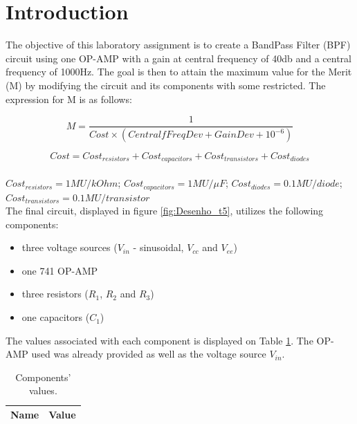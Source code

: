 
\section{Introduction}
\label{sec:introduction}



The objective of this laboratory assignment is to create a BandPass Filter (BPF) circuit using one OP-AMP with a gain at central frequency of 40db and a central frequency of 1000Hz. The goal is then to attain the maximum value for the Merit (M) by modifying the circuit and its components with some restricted. The expression for M is as follows:

\[
M = \frac{1}{Cost\times (CentralfFreqDev + GainDev + 10^{-6})}
\]

\[
 Cost = Cost_{resistors} + Cost_{capacitors} + Cost_{transistors} + Cost_{diodes} 
\] \\

$Cost_{resistors} = 1MU/kOhm$; $Cost_{capacitors} = 1MU/\mu F$; $Cost_{diodes} = 0.1MU/diode$; $Cost_{transistors} = 0.1MU/transistor$ \\

The final circuit, displayed in figure \ref{fig:Desenho_t5}, utilizes the following components:

\begin{itemize}
	\item three voltage sources ($V_{in}$ - sinusoidal, $V_{cc}$ and $V_{ee}$)
	\item one 741 OP-AMP
	\item three resistors ($R_1$, $R_2$ and $R_3$)
	\item one capacitors ($C_1$)
\end{itemize}

The values associated with each component is displayed on Table \ref{tab:vlr}. The OP-AMP used was already provided as well as the voltage source $V_{in}$.

\begin{table}[ht]
	\centering
	\begin{tabular}{|l|r|}
		\hline    
		{\bf Name} & {\bf Value} \\ \hline
    		
	\end{tabular}
	
	\caption{Components' values.}
    
\label{tab:vlr}
\end{table}


